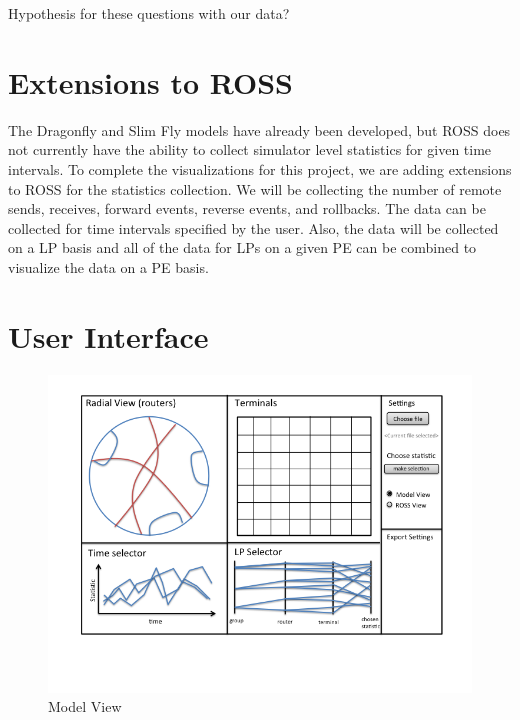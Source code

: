 \documentclass{acm_proc_article-sp}
\begin{document}
\color{red}Hypothesis for these questions with our data?\color{black}

\section{Extensions to ROSS}
The Dragonfly and Slim Fly models have already been developed, but ROSS does not currently have the ability to collect simulator level statistics for given time intervals.  To complete the visualizations for this project, we are adding extensions to ROSS for the statistics collection.  We will be collecting the number of remote sends, receives,  forward events, reverse events, and rollbacks.  The data can be collected for time intervals specified by the user.  Also, the data will be collected on a LP basis and all of the data for LPs on a given PE can be combined to visualize the data on a PE basis.  

\section{User Interface}
\begin{figure}[t]
\centering
   \includegraphics[width=6.5in, clip=true, trim=0 1in 0 0]{../figures/gui-diagram/Slide1.png}
\caption{Model View}
\label{model-view}
\end{figure}
\end{document}
